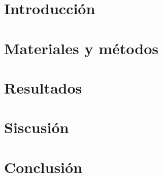 \documentclass{bmcart}
\begin{document}
\begin{frontmatter}
\begin{abstractbox}
\begin{abstract}
			\end{abstract}
			
			
			\begin{keyword}
			\end{keyword}
		
		
		\end{abstractbox}
	
	\end{frontmatter}
	

	
	\section*{Introducción}
	
	\section*{Materiales y métodos}
	
	\section*{Resultados}
	
	\section*{Siscusión}
	
	\section*{Conclusión}
	
	

	
	
	
\end{document}
